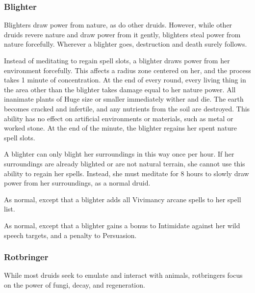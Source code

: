         \subsubsection{Blighter}

            Blighters draw power from nature, as do other druids. However, while other druids revere nature and draw power from it gently, blighters steal power from nature forcefully. Wherever a blighter goes, destruction and death surely follows.

             Instead of meditating to regain spell slots, a blighter draws power from her environment forcefully.
            This affects a \areahuge radius zone centered on her, and the process takes 1 minute of concentration.
            At the end of every round, every living thing in the area other than the blighter takes damage equal to her nature power.
            All inanimate plants of Huge size or smaller immediately wither and die.
            The earth becomes cracked and infertile, and any nutrients from the soil are destroyed.
            This ability has no effect on artificial environments or materials, such as metal or worked stone.
            At the end of the minute, the blighter regains her spent nature spell slots.

            A blighter can only blight her surroundings in this way once per hour.
            If her surroundings are already blighted or are not natural terrain, she cannot use this ability to regain her spells.
            Instead, she must meditate for 8 hours to slowly draw power from her surroundings, as a normal druid.

             As normal, except that a blighter adds all Vivimancy arcane spells to her spell list.

             As normal, except that a blighter gains a  bonus to Intimidate against her wild speech targets, and a  penalty to Persuasion.



        \subsubsection{Rotbringer}

            While most druids seek to emulate and interact with animals, rotbringers focus on the power of fungi, decay, and regeneration.

